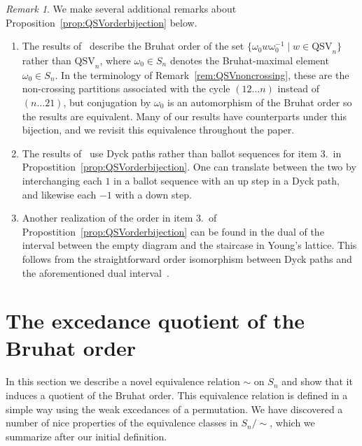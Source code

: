 \documentclass[submission]{FPSAC2024}
\theoremstyle{definition}
\theoremstyle{remark}
\newtheorem{rem}[equation]{Remark}
\numberwithin{equation}{section}
\newcommand{\QSV}{\mathrm{QSV}}
\begin{document}
\begin{rem}\label{rem:auto}
We make several additional remarks about Proposition~\ref{prop:QSVorderbijection} below.
\begin{enumerate}
\item The results of~\cite{GW16} describe the Bruhat order of the set $\{\omega_0w\omega_0^{-1}\; |\; w \in \QSV_{n}\}$ rather than $\QSV_{n}$, where $\omega_0\in S_n$ denotes the Bruhat-maximal element $\omega_0\in S_n$. 
In the terminology of Remark~\ref{rem:QSVnoncrossing}, these are the non-crossing partitions associated with the cycle $(12\ldots n)$ instead of $(n\ldots 21)$, but conjugation by $\omega_{0}$ is an automorphism of the Bruhat order so the results are equivalent.  Many of our results have counterparts under this bijection, and we revisit this equivalence throughout the paper.

\item The results of~\cite{GW16} use Dyck paths rather than ballot sequences for item 3.~in Propostition~\ref{prop:QSVorderbijection}.  
One can translate between the two by interchanging each $1$ in a ballot sequence with an up step in a Dyck path, and likewise each $-1$ with a down step.

\item Another realization of the order in item 3.~of Propostition~\ref{prop:QSVorderbijection} can be found in the dual of the interval between the empty diagram and the staircase in Young's lattice.  This follows from the straightforward order isomorphism between Dyck paths and the aforementioned dual interval~\cite[Solution 6.19 vv]{S99}.

\end{enumerate}
\end{rem}

\section{The excedance quotient of the Bruhat order}
\label{sec:excedance}

In this section we describe a novel equivalence relation $\sim$ on $S_{n}$ and show that it induces a quotient of the Bruhat order.  
This equivalence relation is defined in a simple way using the weak excedances of a permutation.  
We have discovered a number of nice properties of the equivalence classes in $S_{n}\big/\!\!\sim$, which we summarize after our initial definition.
\end{document}
